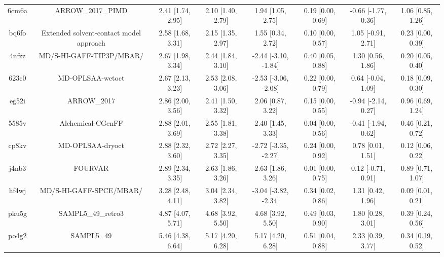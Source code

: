 \documentclass{article}
\begin{document}
\begin{center}
\begin{longtable}{|cccccccc|}
 6cm6a &                                  ARROW\_2017\_PIMD &  2.41 [1.74, 2.95] &  2.10 [1.40, 2.79] &     1.94 [1.05, 2.75] &  0.19 [0.00, 0.69] &  -0.66 [-1.77, 0.36] &     1.06 [0.85, 1.26] \\
 bq6fo &            Extended solvent-contact model approach &  2.58 [1.68, 3.31] &  2.15 [1.35, 2.97] &     1.55 [0.34, 2.72] &  0.10 [0.00, 0.57] &   1.05 [-0.91, 2.71] &     0.23 [0.00, 0.39] \\
 4nfzz &                           MD/S-HI-GAFF-TIP3P/MBAR/ &  2.67 [1.98, 3.34] &  2.44 [1.84, 3.10] &  -2.44 [-3.10, -1.84] &  0.40 [0.05, 0.88] &    1.30 [0.56, 1.86] &     0.20 [0.05, 0.40] \\
 623c0 &                                   MD-OPLSAA-wetoct &  2.67 [2.13, 3.23] &  2.53 [2.08, 3.06] &  -2.53 [-3.06, -2.08] &  0.22 [0.00, 0.79] &   0.64 [-0.04, 1.09] &     0.18 [0.09, 0.30] \\
 eg52i &                                        ARROW\_2017 &  2.86 [2.00, 3.56] &  2.41 [1.50, 3.32] &     2.06 [0.87, 3.22] &  0.15 [0.00, 0.55] &  -0.94 [-2.14, 0.27] &     0.96 [0.69, 1.24] \\
 5585v &                                  Alchemical-CGenFF &  2.88 [2.01, 3.69] &  2.55 [1.81, 3.38] &     2.40 [1.45, 3.33] &  0.04 [0.00, 0.56] &  -0.41 [-1.94, 0.62] &     0.46 [0.21, 0.72] \\
 cp8kv &                                   MD-OPLSAA-dryoct &  2.88 [2.32, 3.60] &  2.72 [2.27, 3.35] &  -2.72 [-3.35, -2.27] &  0.24 [0.00, 0.92] &    0.78 [0.01, 1.51] &     0.12 [0.06, 0.22] \\
 j4nb3 &                                            FOURVAR &  2.89 [2.34, 3.35] &  2.63 [1.86, 3.26] &     2.63 [1.86, 3.26] &  0.01 [0.00, 0.75] &   0.12 [-0.71, 0.91] &     0.89 [0.71, 1.07] \\
 hf4wj &                            MD/S-HI-GAFF-SPCE/MBAR/ &  3.28 [2.48, 4.11] &  3.04 [2.34, 3.82] &  -3.04 [-3.82, -2.34] &  0.34 [0.02, 0.86] &    1.31 [0.42, 1.96] &     0.09 [0.01, 0.21] \\
 pku5g &                                 SAMPL5\_49\_retro3 &  4.87 [4.07, 5.71] &  4.68 [3.92, 5.50] &     4.68 [3.92, 5.50] &  0.49 [0.03, 0.90] &    1.80 [0.28, 3.01] &     0.39 [0.24, 0.56] \\
 po4g2 &                                         SAMPL5\_49 &  5.46 [4.38, 6.64] &  5.17 [4.20, 6.28] &     5.17 [4.20, 6.28] &  0.51 [0.04, 0.88] &    2.33 [0.39, 3.77] &     0.34 [0.19, 0.52] \\
\end{longtable}
\end{center}
\end{document}
